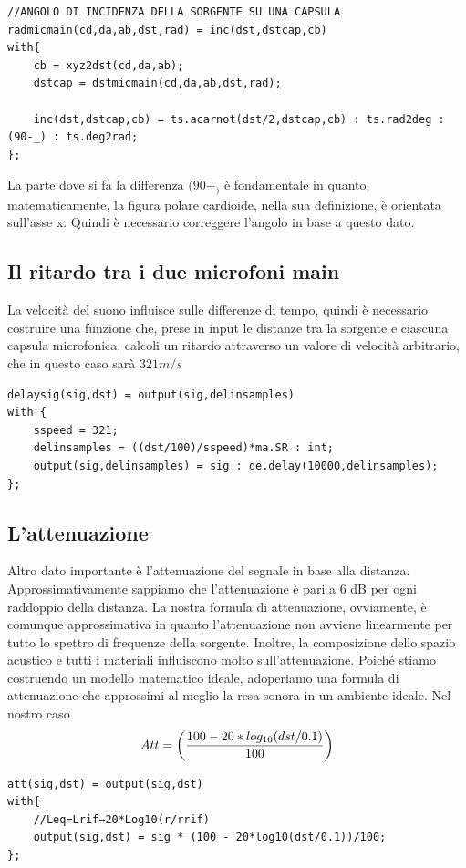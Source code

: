 \documentclass{article}
\begin{document}
    \begin{lstlisting}
//ANGOLO DI INCIDENZA DELLA SORGENTE SU UNA CAPSULA
radmicmain(cd,da,ab,dst,rad) = inc(dst,dstcap,cb)
with{
    cb = xyz2dst(cd,da,ab);
    dstcap = dstmicmain(cd,da,ab,dst,rad);
    
    inc(dst,dstcap,cb) = ts.acarnot(dst/2,dstcap,cb) : ts.rad2deg : (90-_) : ts.deg2rad;
};
    \end{lstlisting}

    La parte dove si fa la differenza $(90-_)$ è fondamentale in quanto, matematicamente, la figura polare cardioide, nella sua definizione, è orientata sull'asse x. Quindi è necessario correggere l'angolo in base a questo dato.\\
\subsection{Il ritardo tra i due microfoni main}
    La velocità del suono influisce sulle differenze di tempo, quindi è necessario costruire una funzione che, prese in input le distanze tra la sorgente e ciascuna capsula microfonica, calcoli un ritardo attraverso un valore di velocità arbitrario, che in questo caso sarà $321 m/s$

    \begin{lstlisting}
delaysig(sig,dst) = output(sig,delinsamples)
with {
    sspeed = 321;
    delinsamples = ((dst/100)/sspeed)*ma.SR : int;
    output(sig,delinsamples) = sig : de.delay(10000,delinsamples);
};
    \end{lstlisting}
    
\subsection{L'attenuazione}
    Altro dato importante è l'attenuazione del segnale in base alla distanza. Approssimativamente sappiamo che l'attenuazione è pari a 6 dB per ogni raddoppio della distanza. La nostra formula di attenuazione, ovviamente, è comunque approssimativa in quanto l'attenuazione non avviene linearmente per tutto lo spettro di frequenze della sorgente. Inoltre, la composizione dello spazio acustico e tutti i materiali influiscono molto sull'attenuazione. Poiché stiamo costruendo un modello matematico ideale, adoperiamo una formula di attenuazione che approssimi al meglio la resa sonora in un ambiente ideale. Nel nostro caso\\
    $$Att = \biggl({100 - 20*log_{10}(dst/0.1)\over100} \biggr)$$
\begin{lstlisting}
att(sig,dst) = output(sig,dst)
with{
    //Leq=Lrif−20*Log10(r/rrif)
    output(sig,dst) = sig * (100 - 20*log10(dst/0.1))/100;
};
\end{lstlisting}
\end{document}
